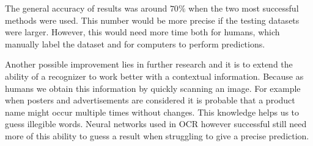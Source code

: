 The general accuracy of results was around $70\%$ when the two most successful methods were used. This number would be more precise if the testing datasets were larger. However, this would need more time both for humans, which manually label the dataset and for computers to perform predictions.

Another possible improvement lies in further research and it is to extend the ability of a recognizer to work better with a contextual information. Because as humans we obtain this information by quickly scanning an image. For example when posters and advertisements are considered it is probable that a product name might occur multiple times without changes. This knowledge helps us to guess illegible words. Neural networks used in OCR however successful still need more of this ability to guess a result when struggling to give a precise prediction.



%